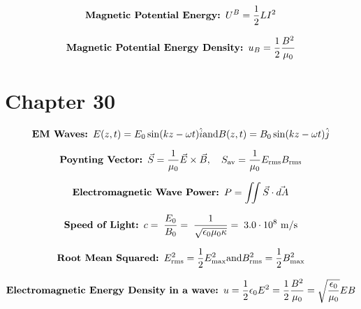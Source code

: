 \documentclass[fleqn,12pt]{article}
\begin{document}
\begin{equation}
    \label{eq2}
   \mbox{\textbf{Magnetic Potential Energy: }} U^B = \frac{1}{2}LI^2
\end{equation}

\begin{equation}
    \label{eq3}
    \mbox{\textbf{Magnetic Potential Energy Density: }}u_B = \frac{1}{2}\frac{B^2}{\mu_0}
\end{equation}

\section*{Chapter 30}

\begin{equation}
    \label{eq3}
    \mbox{\textbf{EM Waves: }}
    {E}(z,t) = {E_0}\sin(kz - \omega t)\hat{i} \\ \mbox{and} \\ {B}(z,t) = {B_0}\sin(kz - \omega t)\hat{j}
\end{equation}


\begin{equation}
    \label{eq3}
    \mbox{\textbf{Poynting Vector: }}
    \vec{S} = \frac{1}{\mu_0}\vec{E} \times \vec{B},\quad S_\mathrm{av} = \frac{1}{\mu_0}E_\mathrm{rms}B_\mathrm{rms}
\end{equation}

\begin{equation}
    \label{eq3}
    \mbox{\textbf{Electromagnetic Wave Power: }}
    P = \iint \vec{S} \cdot \vec{dA}
\end{equation}

\begin{equation}
    \label{eq3}
    \mbox{\textbf{Speed of Light: }}
    c = \; \frac{E_0}{B_0} = \; \frac{1}{\sqrt{\epsilon_0\mu_0\kappa}}  = \; 3.0 \cdot 10^8 \  \si{\meter\per\second}
\end{equation}

\begin{equation}
    \label{eq3}
    \mbox{\textbf{Root Mean Squared: }}
    E_\mathrm{rms}^{2} = \frac{1}{2}E_\mathrm{max}^2 \\ \mbox{and} \\ B_\mathrm{rms}^{2} = \frac{1}{2}B_\mathrm{max}^2
\end{equation}

\begin{equation}
    \label{eq3}
    \mbox{\textbf{Electromagnetic Energy Density in a wave: }}
    u = \frac{1}{2}\epsilon_0E^2 = \frac{1}{2}\frac{B^2}{\mu_0} = \sqrt{\frac{\epsilon_0}{\mu_0}}E B
\end{equation}
\end{document}
